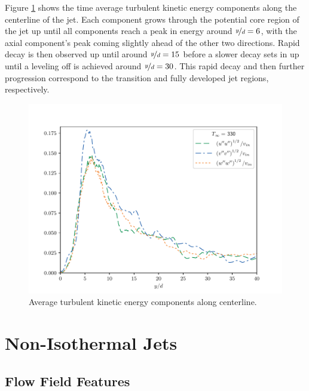 Figure \ref{330_TKE_features} shows the time average turbulent kinetic energy components along the centerline of the jet. Each component grows through the potential core region of the jet up until all components reach a peak in energy around $\nicefrac{y}{d}=6$, with the axial component's peak coming slightly ahead of the other two directions. Rapid decay is then observed up until around $\nicefrac{y}{d} = 15$ before a slower decay sets in up until a leveling off is achieved around $\nicefrac{y}{d} = 30$. This rapid decay and then further progression correspond to the transition and fully developed jet regions, respectively.   

\begin{figure}[hbtp!]
\begin{center}
	\includegraphics[scale=.7]{figures/Plots/centerline/330_TKEuvw_centerline.pdf}
	\caption{Average turbulent kinetic energy components along centerline.} \label{330_TKE_features}
\end{center}
\end{figure}

\section{Non-Isothermal Jets}
\subsection{Flow Field Features}

